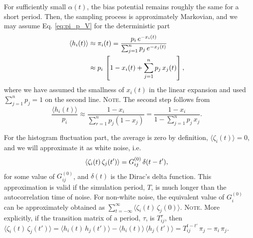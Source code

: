 \documentclass[reprint, superscriptaddress, floatfix]{revtex4-1}
\newcommand{\note}[1]{{\color{DarkGreen}\footnotesize \textsc{Note.} #1}}
\begin{document}
For sufficiently small $\alpha(t)$,
the bias potential remains roughly the same for a short period.
%
Then,
the sampling process is approximately Markovian, %
and we may assume Eq. \eqref{eq:pi_p_V}
for the deterministic part
%
\begin{align}
  \langle h_i(t) \rangle
  &\approx
  \pi_i(t)
  =
  \frac{                p_i \, e^{-x_i(t)} }
       { \sum_{j = 1}^n p_j \, e^{-x_j(t)} }
  \notag
  \\
  &\approx
  p_i \,
  \left[
    1 - x_i(t) + \sum_{j = 1}^n p_j \, x_j(t)
  \right]
  ,
  \label{eq:h_ave}
\end{align}
%
where we have assumed the smallness
of $x_i(t)$ in the linear expansion
and used $\sum_{j=1}^n p_j = 1$
on the second line.
%
\note{
The second step follows from
$$
\frac{ \langle h_i(t) \rangle }
     { p_i }
\approx
\frac{                       1 - x_i  }
     { \sum_{ r = 1 }^n p_j (1 - x_j) }
=
\frac{                       1 - x_i  }
     { 1 - \sum_{ j = 1 }^n p_j \, x_j }
.
$$
}%

%
For the histogram fluctuation part,
the average is zero by definition,
$\langle \zeta_i(t) \rangle = 0$,
%
and we will approximate it as white noise, i.e.
%
\begin{equation}
  \left\langle
    \zeta_i(t) \, \zeta_j(t')
  \right\rangle
  =
  G^{(0)}_{ij} \, \delta(t - t')
  ,
  \notag
\end{equation}
%
for some value of $G^{(0)}_{ij}$,
and $\delta(t)$ is the Dirac's delta function.
%
This approximation is valid if the simulation period, $T$,
is much longer than the autocorrelation time of noise.
%
For non-white noise,
the equivalent value of $G^{(0)}_i$ can be approximately obtained as
$\sum_{t = -\infty}^\infty \langle \zeta_i(t) \, \zeta_j(0) \rangle$.
%
\note{More explicitly,
if the transition matrix of a period, $\tau$,
is $T^\tau_{ij}$,
then
$
  \langle \zeta_i(t) \, \zeta_j(t') \rangle
  =
  \langle h_i(t) \, h_j(t') \rangle
  -
  \langle h_i(t) \rangle \, \langle h_j(t') \rangle
  =
  T^{t - t'}_{ij} \, \pi_j - \pi_i \, \pi_j.
$
}%


%
\end{document}
